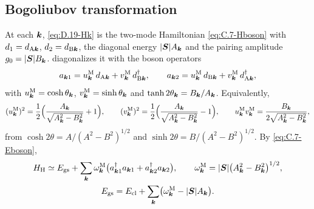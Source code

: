 \subsection*{Bogoliubov transformation}

At each $\bm{k}$, \cref{eq:D.19-Hk} is the two-mode Hamiltonian \cref{eq:C.7-Hboson} with $d_1 = d_{\mathrm{A}\bm{k}}$, $d_2 = d_{\mathrm{B}\bm{k}}$, the diagonal energy $|\bm{S}|A_{\bm{k}}$ and the pairing amplitude $g_0 = |\bm{S}|B_{\bm{k}}$.  diagonalizes it with the boson operators
\begin{equation}
  a_{\bm{k}1} = u^{\mathrm{M}}_{\bm{k}}\,d_{\mathrm{A}\bm{k}} + v^{\mathrm{M}}_{\bm{k}}\,d^\dagger_{\mathrm{B}\bm{k}}, \qquad
  a_{\bm{k}2} = u^{\mathrm{M}}_{\bm{k}}\,d_{\mathrm{B}\bm{k}} + v^{\mathrm{M}}_{\bm{k}}\,d^\dagger_{\mathrm{A}\bm{k}} ,
  \label{eq:D.19-bogo}
\end{equation}
with $u^{\mathrm{M}}_{\bm{k}} = \cosh\theta_{\bm{k}}$, $v^{\mathrm{M}}_{\bm{k}} = \sinh\theta_{\bm{k}}$ and $\tanh2\theta_{\bm{k}} = B_{\bm{k}}/A_{\bm{k}}$. Equivalently,
\begin{equation*}
  (u^{\mathrm{M}}_{\bm{k}})^2 = \frac12\Bigl(\frac{A_{\bm{k}}}{\sqrt{A_{\bm{k}}^2 - B_{\bm{k}}^2}} + 1\Bigr), \qquad
  (v^{\mathrm{M}}_{\bm{k}})^2 = \frac12\Bigl(\frac{A_{\bm{k}}}{\sqrt{A_{\bm{k}}^2 - B_{\bm{k}}^2}} - 1\Bigr), \qquad
  u^{\mathrm{M}}_{\bm{k}}v^{\mathrm{M}}_{\bm{k}} = \frac{B_{\bm{k}}}{2\sqrt{A_{\bm{k}}^2 - B_{\bm{k}}^2}} ,
\end{equation*}
from $\cosh2\theta = A/(A^2 - B^2)^{1/2}$ and $\sinh2\theta = B/(A^2 - B^2)^{1/2}$. By \cref{eq:C.7-Eboson},
\begin{equation}
  \begin{gathered}
  H_{\mathrm{H}} \simeq E_{\mathrm{gs}} + \sum_{\bm{k}}\omega^{\mathrm{M}}_{\bm{k}}\bigl(a^\dagger_{\bm{k}1}a_{\bm{k}1} + a^\dagger_{\bm{k}2}a_{\bm{k}2}\bigr), \qquad
  \omega^{\mathrm{M}}_{\bm{k}} = |\bm{S}|\bigl(A_{\bm{k}}^2 - B_{\bm{k}}^2\bigr)^{1/2} , \\
  E_{\mathrm{gs}} = E_{\mathrm{cl}} + \sum_{\bm{k}}\bigl(\omega^{\mathrm{M}}_{\bm{k}} - |\bm{S}|A_{\bm{k}}\bigr) .
  \end{gathered}
  \label{eq:D.19-omega}
\end{equation}
